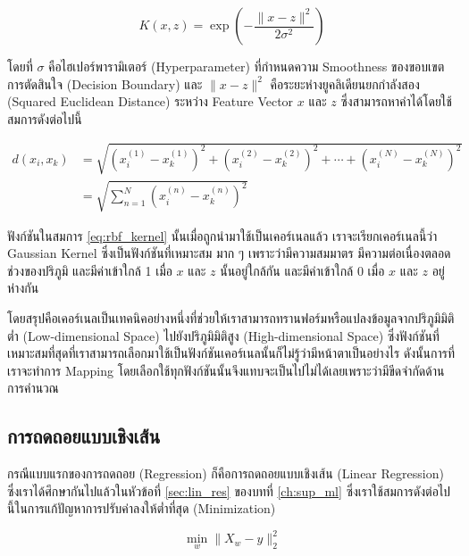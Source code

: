 \begin{equation}\label{eq:rbf_kernel}
    K(x,z) = \exp\left(-\frac{\lVert x - z \rVert^2}{2\sigma^2}\right)   
\end{equation}

\noindent โดยที่ $\sigma$ คือไฮเปอร์พารามิเตอร์ (Hyperparameter) ที่กำหนดความ Smoothness ของขอบเขตการตัดสินใจ (Decision 
Boundary) และ $\lVert x - z \rVert^2$ คือระยะห่างยูคลิเดียนยกกำลังสอง (Squared Euclidean Distance) ระหว่าง Feature 
Vector $x$ และ $z$ ซึ่งสามารถหาค่าได้โดยใช้สมการดังต่อไปนี้

\begin{align}
    d(x_{i}, x_{k}) &= 
    \sqrt{(x^{(1)}_{i} - x^{(1)}_{k})^{2} + (x^{(2)}_{i} - x^{(2)}_{k})^{2} + \cdots + 
    (x^{(N)}_{i} - x^{(N)}_{k})^{2}} \\
    &= \sqrt{\sum^{N}_{n=1} (x^{(n)}_{i} - x^{(n)}_{k})^{2}}
\end{align}

ฟังก์ชันในสมการ \ref{eq:rbf_kernel} นั้นเมื่อถูกนำมาใช้เป็นเคอร์เนลแล้ว เราจะเรียกเคอร์เนลนี้ว่า Gaussian Kernel ซึ่งเป็นฟังก์ชันที่เหมาะสม%
มาก ๆ เพราะว่ามีความสมมาตร มีความต่อเนื่องตลอดช่วงของปริภูมิ และมีค่าเข้าใกล้ 1 เมื่อ $x$ และ $z$ นั้นอยู่ใกล้กัน และมีค่าเข้าใกล้ 0 เมื่อ 
$x$ และ $z$ อยู่ห่างกัน

 โดยสรุปคือเคอร์เนลเป็นเทคนิคอย่างหนึ่งที่ช่วยให้เราสามารถทรานฟอร์มหรือแปลงข้อมูลจากปริภูมิมิติต่ำ (Low-dimensional Space) ไปยังปริภูมิมิติสูง
 (High-dimensional Space) ซึ่งฟังก์ชันที่เหมาะสมที่สุดที่เราสามารถเลือกมาใช้เป็นฟังก์ชันเคอร์เนลนั้นก็ไม่รู้ว่ามีหน้าตาเป็นอย่างไร ดังนั้นการที่%
 เราจะทำการ Mapping โดยเลือกใช้ทุกฟังก์ชันนั้นจึงแทบจะเป็นไปไม่ได้เลยเพราะว่ามีขีดจำกัดด้านการคำนวณ

\subsection{การถดถอยแบบเชิงเส้น}
\label{ssec:lin_reg}

กรณีแบบแรกของการถดถอย (Regression) ก็คือการถดถอยแบบเชิงเส้น (Linear Regression) ซึ่งเราได้ศึกษากันไปแล้วในหัวข้อที่ 
\ref{sec:lin_res} ของบทที่ \ref{ch:sup_ml} ซึ่งเราใช้สมการดังต่อไปนี้ในการแก้ปัญหาการปรับค่าลงให้ต่ำที่สุด (Minimization)

\begin{equation}
    \min_{w} \lVert X_{w} - y \rVert_{2}^{2}
\end{equation}

